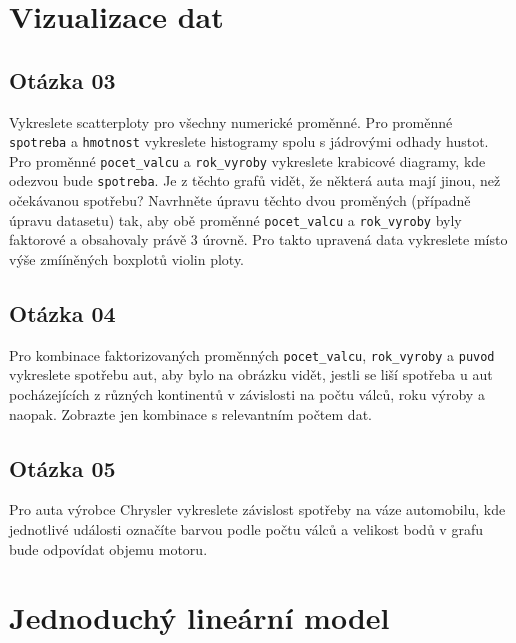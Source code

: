 \documentclass[
]{article}
\begin{document}
\hypertarget{vizualizace-dat}{%
\section{Vizualizace dat}\label{vizualizace-dat}}

\hypertarget{otuxe1zka-03}{%
\subsection{Otázka 03}\label{otuxe1zka-03}}

Vykreslete scatterploty pro všechny numerické proměnné. Pro proměnné
\texttt{spotreba} a \texttt{hmotnost} vykreslete histogramy spolu s
jádrovými odhady hustot. Pro proměnné \texttt{pocet\_valcu} a
\texttt{rok\_vyroby} vykreslete krabicové diagramy, kde odezvou bude
\texttt{spotreba}. Je z těchto grafů vidět, že některá auta mají jinou,
než očekávanou spotřebu? Navrhněte úpravu těchto dvou proměných
(případně úpravu datasetu) tak, aby obě proměnné \texttt{pocet\_valcu} a
\texttt{rok\_vyroby} byly faktorové a obsahovaly právě 3 úrovně. Pro
takto upravená data vykreslete místo výše zmííněných boxplotů violin
ploty.

\hypertarget{otuxe1zka-04}{%
\subsection{Otázka 04}\label{otuxe1zka-04}}

Pro kombinace faktorizovaných proměnných \texttt{pocet\_valcu},
\texttt{rok\_vyroby} a \texttt{puvod} vykreslete spotřebu aut, aby bylo
na obrázku vidět, jestli se liší spotřeba u aut pocházejících z různých
kontinentů v závislosti na počtu válců, roku výroby a naopak. Zobrazte
jen kombinace s relevantním počtem dat.

\hypertarget{otuxe1zka-05}{%
\subsection{Otázka 05}\label{otuxe1zka-05}}

Pro auta výrobce Chrysler vykreslete závislost spotřeby na váze
automobilu, kde jednotlivé události označíte barvou podle počtu válců a
velikost bodů v grafu bude odpovídat objemu motoru.

\hypertarget{jednoduchuxfd-lineuxe1rnuxed-model}{%
\section{Jednoduchý lineární
model}\label{jednoduchuxfd-lineuxe1rnuxed-model}}
\end{document}

